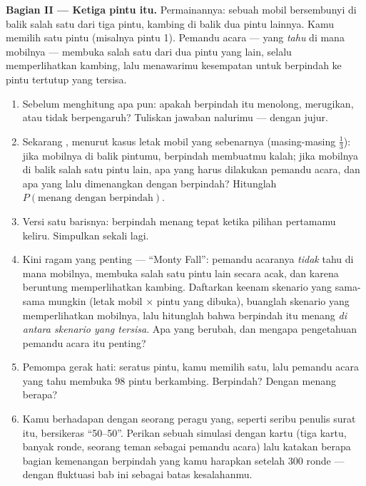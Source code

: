 \begin{problem}
\medskip
\noindent\textbf{Bagian II --- Ketiga pintu itu.}
Permainannya: sebuah mobil bersembunyi di balik salah satu dari tiga pintu,
kambing di balik dua pintu lainnya. Kamu memilih satu pintu (misalnya pintu 1).
Pemandu acara --- yang \emph{tahu} di mana mobilnya --- membuka salah satu dari
dua pintu yang lain, selalu memperlihatkan kambing, lalu menawarimu kesempatan
untuk berpindah ke pintu tertutup yang tersisa.
\begin{enumerate}[resume]
  \item Sebelum menghitung apa pun: apakah berpindah itu menolong, merugikan,
        atau tidak berpengaruh? Tuliskan jawaban nalurimu --- dengan jujur.
  \item Sekarang , menurut kasus letak mobil yang sebenarnya
        (masing-masing $\frac13$): jika mobilnya di balik pintumu,
        berpindah membuatmu kalah; jika mobilnya di balik salah satu pintu
        lain, apa yang harus dilakukan pemandu acara, dan apa yang lalu
        dimenangkan dengan berpindah?
        Hitunglah $P(\text{menang dengan berpindah})$.
  \item Versi satu barisnya: berpindah menang tepat ketika pilihan
        pertamamu keliru. Simpulkan sekali lagi.
  \item Kini ragam yang penting --- ``Monty Fall'': pemandu acaranya
        \emph{tidak} tahu di mana mobilnya, membuka salah satu
        pintu lain secara acak, dan karena beruntung memperlihatkan kambing.
        Daftarkan keenam skenario yang sama-sama mungkin (letak mobil $\times$
        pintu yang dibuka), buanglah skenario yang memperlihatkan mobilnya,
        lalu hitunglah  bahwa berpindah itu menang
        \emph{di antara skenario yang tersisa}. Apa yang berubah, dan
        mengapa pengetahuan pemandu acara itu penting?
  \item Pemompa gerak hati: seratus pintu, kamu memilih satu, lalu
        pemandu acara yang tahu membuka $98$ pintu berkambing. Berpindah?
        Dengan  menang berapa?
  \item Kamu berhadapan dengan seorang peragu yang, seperti seribu penulis
        surat itu, bersikeras ``50--50''. Perikan sebuah simulasi dengan kartu
        (tiga kartu, banyak ronde, seorang teman sebagai pemandu acara) lalu
        katakan berapa bagian kemenangan berpindah yang kamu harapkan setelah
        $300$ ronde --- dengan  fluktuasi bab ini
        sebagai batas kesalahanmu.
\end{enumerate}


\end{problem}
